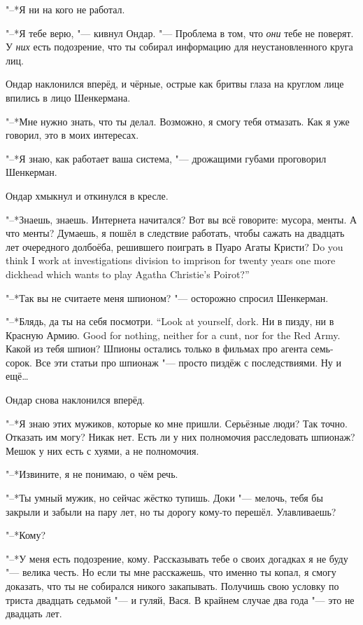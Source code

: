 "--*Я ни на кого не работал.

"--*Я тебе верю, "--- кивнул Ондар.
"--- Проблема в том, что \emph{они} тебе не поверят.
У \emph{них} есть подозрение, что ты собирал информацию для неустановленного круга лиц.

Ондар наклонился вперёд, и чёрные, острые как бритвы глаза на круглом лице впились в лицо Шенкермана.

"--*Мне нужно знать, что ты делал.
Возможно, я смогу тебя отмазать.
Как я уже говорил, это в моих интересах.

"--*Я знаю, как работает ваша система, "--- дрожащими губами проговорил Шенкерман.

Ондар хмыкнул и откинулся в кресле.

"--*Знаешь, знаешь.
Интернета начитался?
Вот вы всё говорите: мусора, менты.
А что менты?
{Думаешь, я пошёл в следствие работать, чтобы сажать на двадцать лет очередного долбоёба, решившего поиграть в Пуаро Агаты Кристи?}
{Do you think I work at investigations division to imprison for twenty years one more dickhead which wants to play Agatha Christie's Poirot?''}

"--*Так вы не считаете меня шпионом? "--- осторожно спросил Шенкерман.

{"--*Блядь, да ты на себя посмотри.}
{``Look at yourself, dork.}
{Ни в пизду, ни в Красную Армию.}
{Good for nothing, neither for a cunt, nor for the Red Army.}
Какой из тебя шпион?
Шпионы остались только в фильмах про агента семь-сорок.
Все эти статьи про шпионаж "--- просто пиздёж с последствиями.
Ну и ещё\ldots{}

Ондар снова наклонился вперёд.

"--*Я знаю этих мужиков, которые ко мне пришли.
Серьёзные люди?
Так точно.
Отказать им могу?
Никак нет.
Есть ли у них полномочия расследовать шпионаж?
Мешок у них есть с хуями, а не полномочия.

"--*Извините, я не понимаю, о чём речь.

"--*Ты умный мужик, но сейчас жёстко тупишь.
Доки "--- мелочь, тебя бы закрыли и забыли на пару лет, но ты дорогу кому-то перешёл.
Улавливаешь?

"--*Кому?

"--*У меня есть подозрение, кому.
Рассказывать тебе о своих догадках я не буду "--- велика честь.
Но если ты мне расскажешь, что именно ты копал, я смогу доказать, что ты не собирался никого закапывать.
Получишь свою условку по триста двадцать седьмой "--- и гуляй, Вася.
В крайнем случае два года "--- это не двадцать лет.

